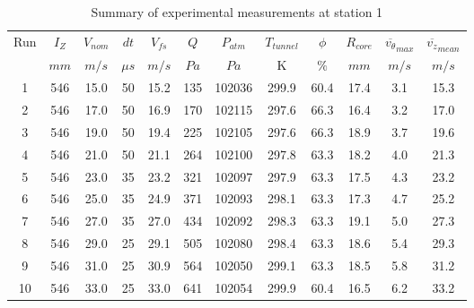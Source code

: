 \begin{table}[H]
\begin{center}
\begin{tabular}{|cccccccccccc|}
	\hline
	Run & $I_Z$ & $V_{nom}$ & $dt$ & $V_{fs}$ & $Q$ & $P_{atm}$ & $T_{tunnel}$ & $\phi$ & $R_{core}$ & $\overline{v_{\theta}}_{max}$ & $\overline{v_{z}}_{mean}$\\
	  & $mm$ & $m/s$ & $\mu s$ & $m/s$ & $Pa$ & $Pa$ & K & $\%$ & $mm$ & $m/s$ & $m/s$\\
	\hline
	1 & 546 & 15.0 & 50 & 15.2 & 135 & 102036 & 299.9 & 60.4 & 17.4 & 3.1 & 15.3\\
	2 & 546 & 17.0 & 50 & 16.9 & 170 & 102115 & 297.6 & 66.3 & 16.4 & 3.2 & 17.0\\
	3 & 546 & 19.0 & 50 & 19.4 & 225 & 102105 & 297.6 & 66.3 & 18.9 & 3.7 & 19.6\\
	4 & 546 & 21.0 & 50 & 21.1 & 264 & 102100 & 297.8 & 63.3 & 18.2 & 4.0 & 21.3\\
	5 & 546 & 23.0 & 35 & 23.2 & 321 & 102097 & 297.9 & 63.3 & 17.5 & 4.3 & 23.2\\
	6 & 546 & 25.0 & 35 & 24.9 & 371 & 102093 & 298.1 & 63.3 & 17.3 & 4.7 & 25.2\\
	7 & 546 & 27.0 & 35 & 27.0 & 434 & 102092 & 298.3 & 63.3 & 19.1 & 5.0 & 27.3\\
	8 & 546 & 29.0 & 25 & 29.1 & 505 & 102080 & 298.4 & 63.3 & 18.6 & 5.4 & 29.3\\
	9 & 546 & 31.0 & 25 & 30.9 & 564 & 102050 & 299.1 & 63.3 & 18.5 & 5.8 & 31.2\\
	10 & 546 & 33.0 & 25 & 33.0 & 641 & 102054 & 299.9 & 60.4 & 16.5 & 6.2 & 33.2\\
	\hline
\end{tabular}
\caption{Summary of experimental measurements at station 1}
\label{table:experiment_results_1}
\end{center}
\end{table}
